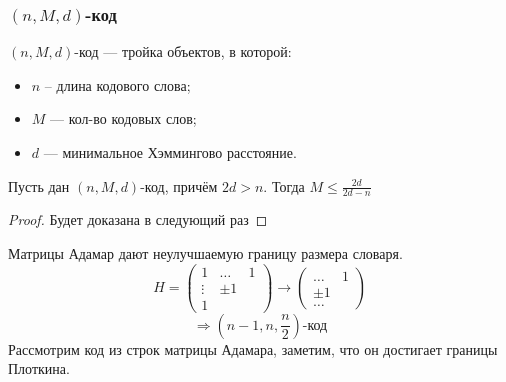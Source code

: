 \subsubsection{$(n, M, d)$-код}
\begin{definition}
  $(n, M, d)$-код --- тройка объектов, в которой:
\begin{itemize}
  \item $n$ -- длина кодового слова;
  \item $M$ --- кол-во кодовых слов;
  \item $d$ --- минимальное Хэммингово расстояние.
\end{itemize}
\end{definition}
\begin{theorem}
\label{theorem:02_6}
  Пусть дан $(n, M, d)$-код, причём $2d > n$. Тогда $M \leq \frac{2d}{2d - n}$
\end{theorem}
\begin{proof}
  Будет доказана в следующий раз
\end{proof}
\begin{note}
  Матрицы Адамар дают неулучшаемую границу размера словаря.
  \[
    H = \begin{pmatrix}1 & \ldots & 1 \\ \vdots  & \pm 1 \\ 1  \end{pmatrix} \rightarrow \begin{pmatrix} \ldots & 1 \\ \pm 1 \\ \ldots\end{pmatrix}
  \]
  \[
  \Rightarrow \left(n - 1, n, \frac{n}{2}\right)\text{-код}
  \]
  Рассмотрим код из строк матрицы Адамара, заметим, что он достигает границы Плоткина.
\end{note}
